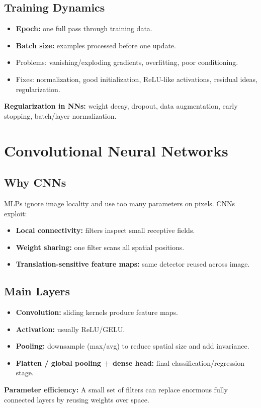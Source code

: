 \documentclass[10pt,twocolumn]{article}
\newcommand{\chead}[1]{\vspace{0.15em}\textbf{#1:} }
\begin{document}
\subsection{Training Dynamics}
\begin{itemize}
  \item \textbf{Epoch:} one full pass through training data.
  \item \textbf{Batch size:} examples processed before one update.
  \item Problems: vanishing/exploding gradients, overfitting, poor conditioning.
  \item Fixes: normalization, good initialization, ReLU-like activations, residual ideas, regularization.
\end{itemize}
\chead{Regularization in NNs} weight decay, dropout, data augmentation, early stopping, batch/layer normalization.

\section{Convolutional Neural Networks}
\subsection{Why CNNs}
MLPs ignore image locality and use too many parameters on pixels. CNNs exploit:
\begin{itemize}
  \item \textbf{Local connectivity:} filters inspect small receptive fields.
  \item \textbf{Weight sharing:} one filter scans all spatial positions.
  \item \textbf{Translation-sensitive feature maps:} same detector reused across image.
\end{itemize}

\subsection{Main Layers}
\begin{itemize}
  \item \textbf{Convolution:} sliding kernels produce feature maps.
  \item \textbf{Activation:} usually ReLU/GELU.
  \item \textbf{Pooling:} downsample (max/avg) to reduce spatial size and add invariance.
  \item \textbf{Flatten / global pooling + dense head:} final classification/regression stage.
\end{itemize}
\chead{Parameter efficiency} A small set of filters can replace enormous fully connected layers by reusing weights over space.
\end{document}

